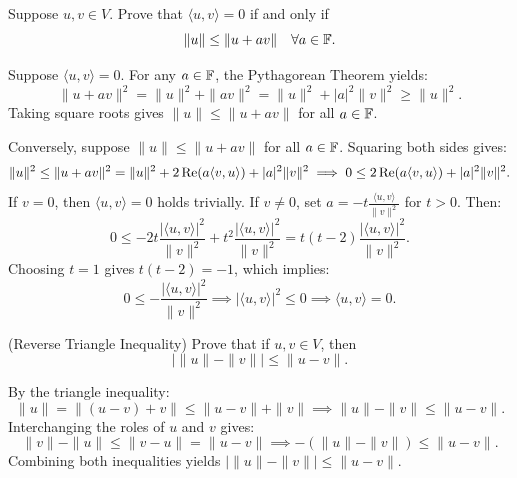 \begin{xrcs}
  Suppose $u, v \in V$. Prove that $\langle u, v \rangle = 0$ if and only if
  \begin{equation}
    \|u\| \leq \|u + a v\| \quad \forall a \in \mathbb{F}.
  \end{equation}

\begin{xprf}
  \Rightarrowdirection Suppose $\langle u, v \rangle = 0$. For any $a \in \mathbb{F}$, the Pythagorean Theorem yields:
  \[
    \|u + av\|^2 = \|u\|^2 + \|av\|^2 = \|u\|^2 + |a|^2 \|v\|^2 \geq \|u\|^2.
  \]
  Taking square roots gives $\|u\| \leq \|u + av\|$ for all $a \in \mathbb{F}$.

  \Leftarrowdirection Conversely, suppose $\|u\| \leq \|u + av\|$ for all $a \in \mathbb{F}$.
  Squaring both sides gives:
  \[
    \|u\|^2 \leq \|u + av\|^2 = \|u\|^2 + 2\operatorname{Re}(a \langle v, u \rangle) + |a|^2 \|v\|^2 \implies 0 \leq 2\operatorname{Re}(a \langle v, u \rangle) + |a|^2 \|v\|^2.
  \]
  If $v = 0$, then $\langle u, v \rangle = 0$ holds trivially.
  If $v \neq 0$, set $a = -t \frac{\langle u, v \rangle}{\|v\|^2}$ for $t > 0$. Then:
  \[
    0 \leq -2t \frac{|\langle u, v \rangle|^2}{\|v\|^2} + t^2 \frac{|\langle u, v \rangle|^2}{\|v\|^2} = t(t-2) \frac{|\langle u, v \rangle|^2}{\|v\|^2}.
  \]
  Choosing $t = 1$ gives $t(t-2) = -1$, which implies:
  \[
    0 \leq -\frac{|\langle u, v \rangle|^2}{\|v\|^2} \implies |\langle u, v \rangle|^2 \leq 0 \implies \langle u, v \rangle = 0.
  \]
\end{xprf}
\end{xrcs}

\begin{xrcs}
  (Reverse Triangle Inequality) Prove that if $u, v \in V$, then
  \begin{equation}
    |\|u\| - \|v\|| \leq \|u - v\|.
  \end{equation}

\begin{xprf}
  By the triangle inequality:
  \[
    \|u\| = \|(u - v) + v\| \leq \|u - v\| + \|v\| \implies \|u\| - \|v\| \leq \|u - v\|.
  \]
  Interchanging the roles of $u$ and $v$ gives:
  \[
    \|v\| - \|u\| \leq \|v - u\| = \|u - v\| \implies -(\|u\| - \|v\|) \leq \|u - v\|.
  \]
  Combining both inequalities yields $|\|u\| - \|v\|| \leq \|u - v\|$.
\end{xprf}
\end{xrcs}

